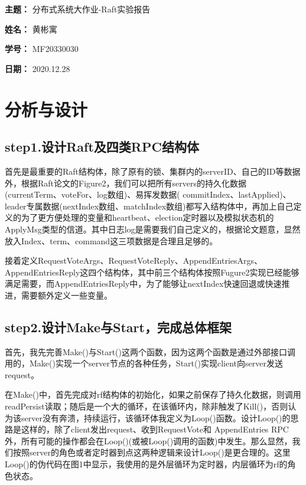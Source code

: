 \documentclass[UTF8]{article}
\begin{document}
    
{\flushleft \bf \Large 主题：} 分布式系统大作业-Raft实验报告

{\flushleft \bf \Large 姓名：} 黄彬寓

{\flushleft \bf \Large 学号：} MF20330030

{\flushleft \bf \Large 日期：} 2020.12.28

\section{分析与设计}

\subsection{step1.设计Raft及四类RPC结构体}
首先是最重要的Raft结构体，除了原有的锁、集群内的serverID、自己的ID等数据外，根据Raft论文的Figure2，我们可以把所有servers的持久化数据(currentTerm、voteFor、log数组)、易挥发数据( commitIndex、lastApplied)、leader专属数据(nextIndex数组、matchIndex数组)都写入结构体中，再加上自己定义的为了更方便处理的变量和heartbeat、election定时器以及模拟状态机的ApplyMsg类型的信道。其中日志log是需要我们自己定义的，根据论文题意，显然放入Index、term、command这三项数据是合理且足够的。

接着定义RequestVoteArgs、RequestVoteReply、AppendEntriesArgs、AppendEntriesReply这四个结构体，其中前三个结构体按照Fugure2实现已经能够满足需要，而AppendEntriesReply中，为了能够让nextIndex快速回退或快速推进，需要额外定义一些变量。

\subsection{step2.设计Make与Start，完成总体框架}
首先，我先完善Make()与Start()这两个函数，因为这两个函数是通过外部接口调用的，Make()实现一个server节点的各种任务，Start()实现client向server发送request。

在Make()中，首先完成对rf结构体的初始化，如果之前保存了持久化数据，则调用readPersist读取；随后是一个大的循环，在该循环内，除非触发了Kill()，否则认为该server没有奔溃，持续运行，该循环体我定义为Loop()函数。设计Loop()的思路是这样的，除了client发出request、收到RequestVote和 AppendEntries RPC外，所有可能的操作都会在Loop()(或被Loop()调用的函数)中发生。那么显然，我们按照server的角色或者定时器到点这两种逻辑来设计Loop()是更合理的。这里Loop()的伪代码在图1中显示，我使用的是外层循环为定时器，内层循环为rf的角色状态。
\end{document}
